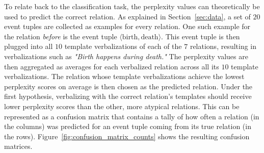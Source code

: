 \documentclass[11pt]{article}
\begin{document}
To relate back to the classification task, the perplexity values can theoretically be used to predict the correct relation. As explained in Section~\ref{sec:data}, a set of $20$ event tuples are collected as examples for every relation. One such example for the relation \textit{before} is the event tuple $\langle \text{birth}, \text{death} \rangle$. This event tuple is then plugged into all $10$ template verbalizations of each of the $7$ relations, resulting in verbalizations such as \textit{"Birth happens during death."} The perplexity values are then aggregated as averages for each verbalized relation across all its $10$ template verbalizations. 
The relation whose template verbalizations achieve the lowest perplexity scores on average is then chosen as the predicted relation. Under the first hypothesis, verbalizing with the correct relation's templates should receive lower perplexity scores than the other, more atypical relations. This can be represented as a confusion matrix that contains a tally of how often a relation (in the columns) was predicted for an event tuple coming from its true relation (in the rows). Figure~\ref{fig:confusion_matrix_counts} shows the resulting confusion matrices.
\end{document}
